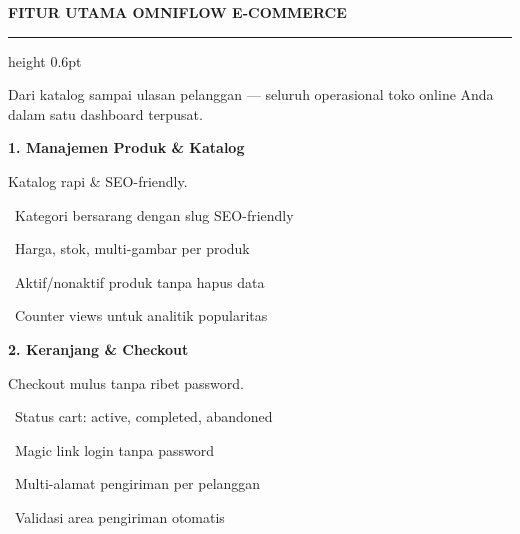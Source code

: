 \documentclass[a4paper]{article}
\newcommand{\sectiontitle}[1]{%
    \vspace{10pt}%
    {\fontsize{13}{16}\selectfont\bfseries\color{BlueDark} #1}\par\vspace{3pt}%
    {\color{BluePrimary}\hrule height 0.6pt}\par\vspace{8pt}%
}
\begin{document}
\setlength{\parskip}{2pt}

\sectiontitle{FITUR UTAMA OMNIFLOW E-COMMERCE}

{\fontsize{9.5}{13}\selectfont\color{TextLight}
Dari katalog sampai ulasan pelanggan --- seluruh operasional toko online Anda dalam satu dashboard terpusat.}

\vspace{6pt}

\noindent
\begin{minipage}[t]{0.485\textwidth}
    \colorbox{BluePrimary}{%
        \begin{minipage}{\dimexpr\textwidth-2\fboxsep\relax}
            {\fontsize{10}{13}\selectfont\bfseries\color{White} 1. Manajemen Produk \& Katalog}
        \end{minipage}}\par
    \vspace{4pt}
    {\fontsize{9}{12}\selectfont\color{TextDark}%
    Katalog rapi \& SEO-friendly.\par\vspace{3pt}
    \textbullet\ Kategori bersarang dengan slug SEO-friendly\par\vspace{2pt}%
    \textbullet\ Harga, stok, multi-gambar per produk\par\vspace{2pt}%
    \textbullet\ Aktif/nonaktif produk tanpa hapus data\par\vspace{2pt}%
    \textbullet\ Counter views untuk analitik popularitas}%
\end{minipage}%
\hfill
\begin{minipage}[t]{0.485\textwidth}
    \colorbox{EmeraldPrimary}{%
        \begin{minipage}{\dimexpr\textwidth-2\fboxsep\relax}
            {\fontsize{10}{13}\selectfont\bfseries\color{White} 2. Keranjang \& Checkout}
        \end{minipage}}\par
    \vspace{4pt}
    {\fontsize{9}{12}\selectfont\color{TextDark}%
    Checkout mulus tanpa ribet password.\par\vspace{3pt}
    \textbullet\ Status cart: active, completed, abandoned\par\vspace{2pt}%
    \textbullet\ Magic link login tanpa password\par\vspace{2pt}%
    \textbullet\ Multi-alamat pengiriman per pelanggan\par\vspace{2pt}%
    \textbullet\ Validasi area pengiriman otomatis}%
\end{minipage}
\end{document}
